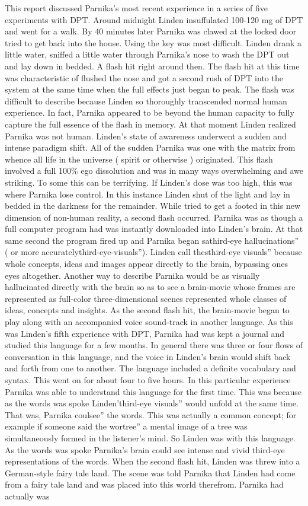 \documentclass[12pt]{book}
\begin{document}
This report discussed Parnika's most recent experience in a series of five experiments with DPT. Around midnight Linden insuffulated 100-120 mg of DPT and went for a walk. By 40 minutes later Parnika was clawed at the locked door tried to get back into the house. Using the key was most difficult. Linden drank a little water, sniffed a little water through Parnika's nose to wash the DPT out and lay down in bedded. A flash hit right around then. The flash hit at this time was characteristic of flushed the nose and got a second rush of DPT into the system at the same time when the full effects just began to peak. The flash was difficult to describe because Linden so thoroughly transcended normal human experience. In fact, Parnika appeared to be beyond the human capacity to fully capture the full essence of the flash in memory. At that moment Linden realized Parnika was not human. Linden's state of awareness underwent a sudden and intense paradigm shift. All of the sudden Parnika was one with the matrix from whence all life in the universe ( spirit or otherwise ) originated. This flash involved a full 100\% ego dissolution and was in many ways overwhelming and awe striking. To some this can be terrifying. If Linden's dose was too high, this was where Parnika lose control. In this instance Linden shut of the light and lay in bedded in the darkness for the remainder. While tried to get a footed in this new dimension of non-human reality, a second flash occurred. Parnika was as though a full computer program had was instantly downloaded into Linden's brain. At that same second the program fired up and Parnika began sathird-eye hallucinations'' ( or more accuratelythird-eye-visuals''). Linden call thesthird-eye visuals'' because whole concepts, ideas and images appear directly to the brain, bypassing ones eyes altogether. Another way to describe Parnika would be as visually hallucinated directly with the brain so as to see a brain-movie whose frames are represented as full-color three-dimensional scenes represented whole classes of ideas, concepts and insights. As the second flash hit, the brain-movie began to play along with an accompanied voice sound-track in another language. As this was Linden's fifth experience with DPT, Parnika had was kept a journal and studied this language for a few months. In general there was three or four flows of conversation in this language, and the voice in Linden's brain would shift back and forth from one to another. The language included a definite vocabulary and syntax. This went on for about four to five hours. In this particular experience Parnika was able to understand this language for the first time. This was because as the words was spoke Linden'third-eye visuals'' would unfold at the same time. That was, Parnika coulsee'' the words. This was actually a common concept; for example if someone said the wortree'' a mental image of a tree was simultaneously formed in the listener's mind. So Linden was with this language. As the words was spoke Parnika's brain could see intense and vivid third-eye representations of the words. When the second flash hit, Linden was threw into a German-style fairy tale land. The scene was told Parnika that Linden had come from a fairy tale land and was placed into this world therefrom. Parnika had actually was 
\end{document}
